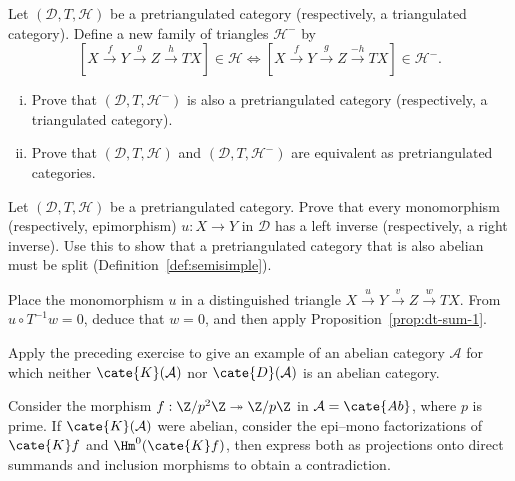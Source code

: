 \begin{Exercises}
	\item Let $(\mathcal{D}, T, \mathcal{H})$ be a pretriangulated category
	(respectively, a triangulated category). Define a new family of triangles
	$\mathcal{H}^-$ by
	\[ [X \xrightarrow{f} Y \xrightarrow{g} Z \xrightarrow{h} TX] \in \mathcal{H} \iff [X \xrightarrow{f} Y \xrightarrow{g} Z \xrightarrow{-h} TX] \in \mathcal{H}^- . \]
	\begin{enumerate}[(i)]
		\item Prove that $(\mathcal{D},T,\mathcal{H}^-)$ is also a
		pretriangulated category (respectively, a triangulated category).
		\item Prove that $(\mathcal{D},T,\mathcal{H})$ and
		$(\mathcal{D},T,\mathcal{H}^-)$ are equivalent as pretriangulated
		categories.
	\end{enumerate}

	\item Let $(\mathcal{D},T,\mathcal{H})$ be a pretriangulated category.
	Prove that every monomorphism (respectively, epimorphism) $u:X\to Y$ in
	$\mathcal{D}$ has a left inverse (respectively, a right inverse). Use this
	to show that a pretriangulated category that is also abelian must be split
	(Definition~\ref{def:semisimple}).

	\begin{hint}
		Place the monomorphism $u$ in a distinguished triangle
		$X\xrightarrow{u}Y\xrightarrow{v}Z\xrightarrow{w}TX$. From
		$u\circ T^{-1}w=0$, deduce that $w=0$, and then apply
		Proposition~\ref{prop:dt-sum-1}.
	\end{hint}

	\item Apply the preceding exercise to give an example of an abelian category
	$\mathcal{A}$ for which neither $\cate{K}(\mathcal{A})$ nor
	$\cate{D}(\mathcal{A})$ is an abelian category.

	\begin{hint}
		Consider the morphism $f:\Z/p^2\Z\twoheadrightarrow\Z/p\Z$ in
		$\mathcal{A}=\cate{Ab}$, where $p$ is prime. If
		$\cate{K}(\mathcal{A})$ were abelian, consider the epi--mono
		factorizations of $\cate{K}f$ and $\Hm^0(\cate{K}f)$, then express both
		as projections onto direct summands and inclusion morphisms to obtain a
		contradiction.
	\end{hint}


\end{Exercises}
